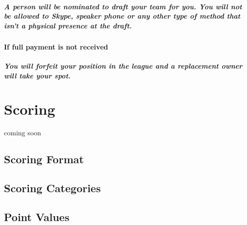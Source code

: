 \documentclass[]{book}
\let\oldparagraph\paragraph
\renewcommand{\paragraph}[1]{\oldparagraph{#1}\mbox{}}
\begin{document}
\hypertarget{a-person-will-be-nominated-to-draft-your-team-for-you.-you-will-not-be-allowed-to-skype-speaker-phone-or-any-other-type-of-method-that-isnt-a-physical-presence-at-the-draft.}{%
\paragraph{A person will be nominated to draft your team for you. You will not be allowed to Skype, speaker phone or any other type of method that isn't a physical presence at the draft.}\label{a-person-will-be-nominated-to-draft-your-team-for-you.-you-will-not-be-allowed-to-skype-speaker-phone-or-any-other-type-of-method-that-isnt-a-physical-presence-at-the-draft.}}

\hypertarget{if-full-payment-is-not-received}{%
\subsubsection{If full payment is not received}\label{if-full-payment-is-not-received}}

\hypertarget{you-will-forfeit-your-position-in-the-league-and-a-replacement-owner-will-take-your-spot.}{%
\paragraph{You will forfeit your position in the league and a replacement owner will take your spot.}\label{you-will-forfeit-your-position-in-the-league-and-a-replacement-owner-will-take-your-spot.}}

\hypertarget{scoring}{%
\chapter{Scoring}\label{scoring}}

coming soon

\hypertarget{scoring-format}{%
\section{Scoring Format}\label{scoring-format}}

\hypertarget{scoring-categories}{%
\section{Scoring Categories}\label{scoring-categories}}

\hypertarget{point-values}{%
\section{Point Values}\label{point-values}}
\end{document}
